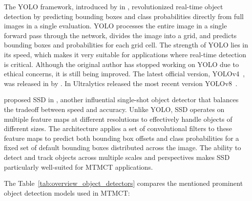 The YOLO framework, introduced by \citeauthor{Redmon15} in \citeyear{Redmon15}, revolutionized real-time object detection by predicting bounding boxes and class probabilities directly from full images in a single evaluation. YOLO processes the entire image in a single forward pass through the network, divides the image into a grid, and predicts bounding boxes and probabilities for each grid cell. The strength of YOLO lies in its speed, which makes it very suitable for applications where real-time detection is critical. Although the original author has stopped working on YOLO due to ethical concerns, it is still being improved. The latest official version, YOLOv4~\cite{Bochkovskiy20}, was released in \citeyear{Bochkovskiy20} by \citeauthor{Bochkovskiy20}. In \citeyear{Jocher23a} Ultralytics released the most recent version YOLOv8~\cite{Jocher23a, Jocher23b}.

\citeauthor{Liu16} proposed SSD in \citeyear{Liu16}, another influential single-shot object detector that balances the tradeoff between speed and accuracy. Unlike YOLO, SSD operates on multiple feature maps at different resolutions to effectively handle objects of different sizes. The architecture applies a set of convolutional filters to these feature maps to predict both bounding box offsets and class probabilities for a fixed set of default bounding boxes distributed across the image. The ability to detect and track objects across multiple scales and perspectives makes SSD particularly well-suited for MTMCT applications.

\begin{table}[ht]
	\centering
	\caption{Overview Object Detectors}\label{tab:overview_object_detectors}
\end{table}

The Table~\ref{tab:overview_object_detectors} compares the mentioned prominent object detection models used in MTMCT:

